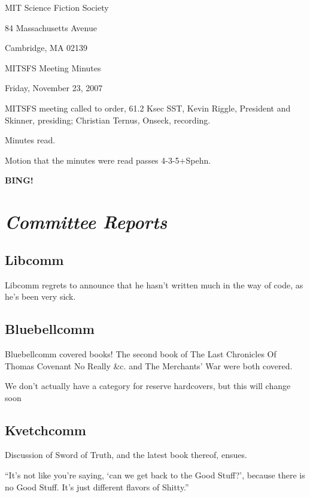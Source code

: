 \documentclass[10pt]{article}
\newcommand{\bing}{{\bf BING!} }
\newcommand{\goto}[1]{\bing \vskip 12pt \section*{{\em{#1}}}}
\begin{document}
\begin{center}

MIT Science Fiction Society

84 Massachusetts Avenue

Cambridge, MA 02139

\vspace{12pt}

MITSFS Meeting Minutes

Friday, November 23, 2007

\end{center}

\vspace{18pt}

\setlength{\parskip}{6pt}

\noindent
MITSFS meeting called to order, 61.2 Ksec SST,
Kevin Riggle, President and Skinner, presiding; Christian Ternus, Onseck, recording.

Minutes read.

Motion that the minutes were read passes 4-3-5+Spehn.

\BING

\goto{Committee Reports}

\subsection*{Libcomm}

Libcomm regrets to announce that he hasn't written much in the way of code, as he's been very sick.

\subsection*{Bluebellcomm}

Bluebellcomm covered books!  The second book of The Last Chronicles Of Thomas Covenant No Really \&c. and The Merchants' War were both covered.

We don't actually have a category for reserve hardcovers, but this will change soon

\subsection*{Kvetchcomm}

Discussion of Sword of Truth, and the latest book thereof, ensues.

``It's not like you're saying, `can we get back to the Good Stuff?',
because there is no Good Stuff.  It's just different flavors of
Shitty.''
\end{document}
